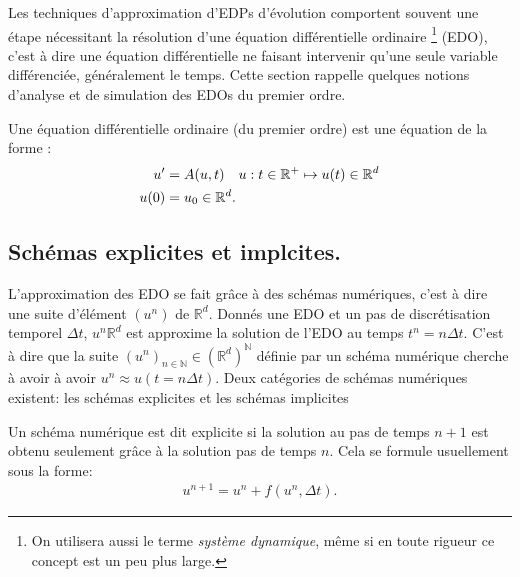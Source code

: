 Les techniques d'approximation d'EDPs d'évolution comportent souvent une étape nécessitant la résolution d'une équation différentielle ordinaire
\footnote{On utilisera aussi le terme \textit{système dynamique}, même si en toute rigueur ce concept est un peu plus large.} (EDO),
c'est à dire une équation différentielle ne faisant intervenir qu'une seule variable différenciée, généralement le temps. Cette section rappelle 
quelques notions d'analyse et de simulation des EDOs du premier ordre.\par

\begin{definition}
    Une équation différentielle ordinaire (du premier ordre) est une équation de la forme :
    \begin{align}\label{def:def_ODE}
        u' &= A(u,t)\quad u : t \in \mathbb{R}^+ \mapsto u(t) \in \mathbb{R}^d\\\notag
        u(0)&=u_0 \in \mathbb{R}^d.
    \end{align}
\end{definition}
\subsection{Schémas explicites et implcites.}
L'approximation des EDO se fait grâce à des schémas numériques, c'est à dire une suite d'élément $(u^n)$ de $\mathbb{R}^d$.
Donnés une EDO et un pas de discrétisation temporel $\Delta t$, $u^n \mathbb{R}^d$ est approxime la solution de l'EDO au temps $t^n = n \Delta t$.
C'est à dire que la suite $(u^n)_{n\in \mathbb{N}} \in (\mathbb R^d)^\mathbb{N}$ définie par un schéma numérique cherche à avoir à avoir $u^n \approx u(t=n\Delta t)$.
Deux catégories de schémas numériques existent: les schémas explicites et les schémas implicites


\begin{definition}
    Un schéma numérique est dit explicite si la solution au pas de temps $n+1$ est obtenu seulement grâce à la solution pas de temps $n$. Cela se formule usuellement sous la forme:
    \begin{align}
        u^{n+1} = u^n + f(u^n ,\Delta t ).
    \end{align}
\end{definition}

